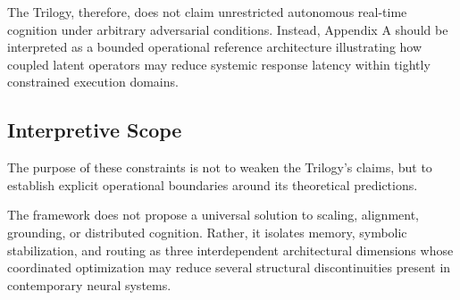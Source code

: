 The Trilogy, therefore, does not claim unrestricted autonomous real-time cognition under arbitrary adversarial conditions. Instead, Appendix A should be interpreted as a bounded operational reference architecture illustrating how coupled latent operators may reduce systemic response latency within tightly constrained execution domains.

\subsection{Interpretive Scope}

The purpose of these constraints is not to weaken the Trilogy's claims, but to establish explicit operational boundaries around its theoretical predictions.

The framework does not propose a universal solution to scaling, alignment, grounding, or distributed cognition. Rather, it isolates memory, symbolic stabilization, and routing as three interdependent architectural dimensions whose coordinated optimization may reduce several structural discontinuities present in contemporary neural systems.

